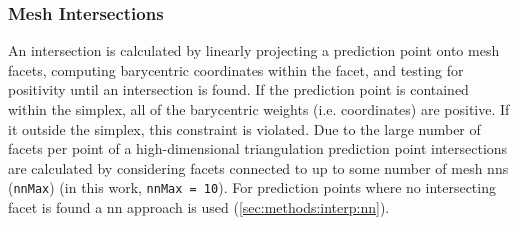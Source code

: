 \documentclass[preprint,12pt]{elsarticle}
\begin{document}
\subsubsection{Mesh Intersections}
An intersection is calculated by linearly projecting a prediction point onto mesh facets, computing barycentric coordinates within the facet, and testing for positivity \cite{langerSphericalBarycentricCoordinates2006} until an intersection is found. If the prediction point is contained within the simplex, all of the barycentric weights (i.e. coordinates) are positive. If it outside the simplex, this constraint is violated. Due to the large number of facets per point of a high-dimensional
triangulation
prediction point intersections are calculated by considering facets connected to up to some number of mesh \glspl{nn} (\texttt{nnMax}) (in this work, \texttt{nnMax = 10}). For prediction points where no intersecting facet is found
a \gls{nn} approach is used (\cref{sec:methods:interp:nn}).

\end{document}
